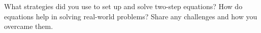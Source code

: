 \documentclass[12pt]{article}
\begin{document}
\begin{tcolorbox}[colframe=black!60, colback=white, 
coltitle=black, colbacktitle=black!15, fonttitle=\bfseries\Large, 
title=Reflection, halign title=center, left=10pt, right=10pt, top=10pt, bottom=110pt]
What strategies did you use to set up and solve two-step equations? How do equations help in solving real-world problems? Share any challenges and how you overcame them.
\end{tcolorbox}
\end{document}

